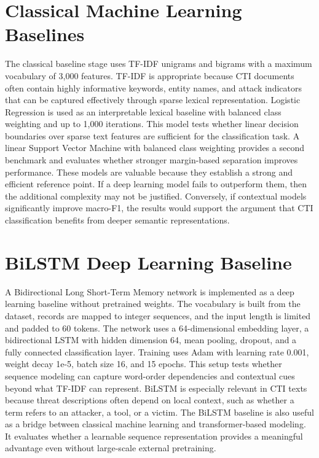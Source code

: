 \documentclass[12pt,a4paper]{report}
\begin{document}
\section{Classical Machine Learning
Baselines}\label{classical-machine-learning-baselines}

The classical baseline stage uses TF-IDF unigrams and bigrams with a
maximum vocabulary of 3,000 features. TF-IDF is appropriate because CTI
documents often contain highly informative keywords, entity names, and
attack indicators that can be captured effectively through sparse
lexical representation. Logistic Regression is used as an interpretable
lexical baseline with balanced class weighting and up to 1,000
iterations. This model tests whether linear decision boundaries over
sparse text features are sufficient for the classification task. A
linear Support Vector Machine with balanced class weighting provides a
second benchmark and evaluates whether stronger margin-based separation
improves performance. These models are valuable because they establish a
strong and efficient reference point. If a deep learning model fails to
outperform them, then the additional complexity may not be justified.
Conversely, if contextual models significantly improve macro-F1, the
results would support the argument that CTI classification benefits from
deeper semantic representations.
\section{BiLSTM Deep Learning
Baseline}\label{bilstm-deep-learning-baseline}

A Bidirectional Long Short-Term Memory network is implemented as a deep
learning baseline without pretrained weights. The vocabulary is built
from the dataset, records are mapped to integer sequences, and the input
length is limited and padded to 60 tokens. The network uses a
64-dimensional embedding layer, a bidirectional LSTM with hidden
dimension 64, mean pooling, dropout, and a fully connected
classification layer. Training uses Adam with learning rate 0.001,
weight decay 1e-5, batch size 16, and 15 epochs. This setup tests
whether sequence modeling can capture word-order dependencies and
contextual cues beyond what TF-IDF can represent. BiLSTM is especially
relevant in CTI texts because threat descriptions often depend on local
context, such as whether a term refers to an attacker, a tool, or a
victim. The BiLSTM baseline is also useful as a bridge between classical
machine learning and transformer-based modeling. It evaluates whether a
learnable sequence representation provides a meaningful advantage even
without large-scale external pretraining.
\end{document}

